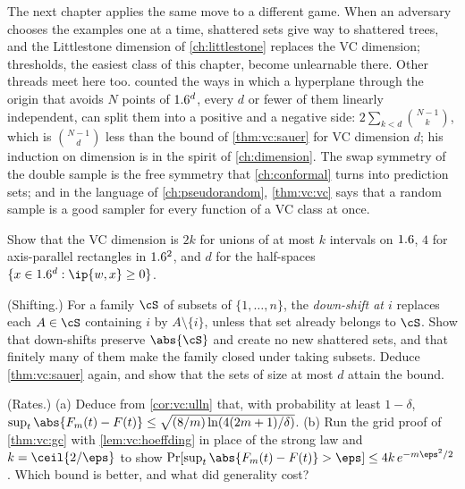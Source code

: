 \begin{refsection}
The next chapter applies the same move to a different game. When an adversary chooses the examples one at a time, shattered sets give way to shattered trees, and the Littlestone dimension of \cref{ch:littlestone} replaces the VC dimension; thresholds, the easiest class of this chapter, become unlearnable there. Other threads meet here too. \textcite{Cover1965} counted the ways in which a hyperplane through the origin that avoids $N$ points of $1.6^d$, every $d$ or fewer of them linearly independent, can split them into a positive and a negative side: $2\sum_{k<d}\binom{N-1}{k}$, which is $\binom{N-1}{d}$ less than the bound of \cref{thm:vc:sauer} for VC dimension $d$; his induction on dimension is in the spirit of \cref{ch:dimension}. The swap symmetry of the double sample is the free symmetry that \cref{ch:conformal} turns into prediction sets; and in the language of \cref{ch:pseudorandom}, \cref{thm:vc:vc} says that a random sample is a good sampler for every function of a VC class at once.

\begin{exercises}
\item \consolidation Show that the VC dimension is $2k$ for unions of at most $k$ intervals on $1.6$, $4$ for axis-parallel rectangles in $1.6^2$, and $d$ for the half-spaces $\{x\in\R^d:\ip{w,x}\ge0\}$.\label{exr:vc:dims}

\item \consolidation\hard (Shifting.) For a family $\cS$ of subsets of $\{1,\dots,n\}$, the \emph{down-shift at $i$} replaces each $A\in\cS$ containing $i$ by $A\setminus\{i\}$, unless that set already belongs to $\cS$. Show that down-shifts preserve $\abs{\cS}$ and create no new shattered sets, and that finitely many of them make the family closed under taking subsets. Deduce \cref{thm:vc:sauer} again, and show that the sets of size at most $d$ attain the bound. \label{exr:vc:shifting}

\item \consolidation (Rates.) (a) Deduce from \cref{cor:vc:ulln} that, with probability at least $1-\delta$, $\sup_t\abs{F_m(t)-F(t)}\le\sqrt{(8/m)\ln(4(2m+1)/\delta)}$. (b) Run the grid proof of \cref{thm:vc:gc} with \cref{lem:vc:hoeffding} in place of the strong law and $k = \ceil{2/\eps}$ to show $\Pr[\sup_t\abs{F_m(t)-F(t)}>\eps]\le4k\,e^{-m\eps^2/2}$. Which bound is better, and what did generality cost?\label{exr:vc:rates}


\end{exercises}
\end{refsection}
